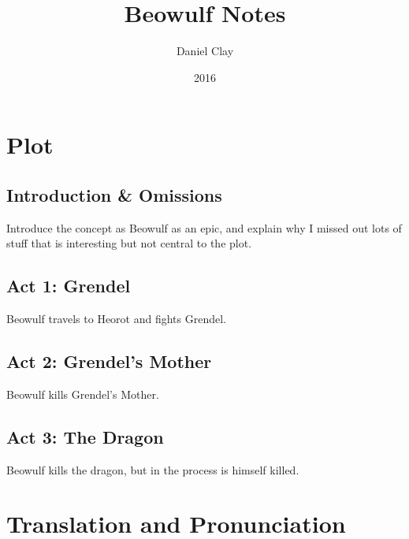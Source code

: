 \documentclass[a4paper]{article}
\begin{document}
\title{Beowulf Notes}
\date{2016}
\author{
Daniel Clay \\ 
}
\maketitle

\section{Plot}

\subsection{Introduction \& Omissions}%

Introduce the concept as Beowulf as an epic, and explain why I missed out lots of
stuff that is interesting but not central to the plot. 

\subsection{Act 1: Grendel}%

Beowulf travels to Heorot and fights Grendel.

\subsection{Act 2: Grendel's Mother}%

Beowulf kills Grendel's Mother.

\subsection{Act 3: The Dragon}%

Beowulf kills the dragon, but in the process is himself killed.

\section{Translation and Pronunciation}
\end{document}
